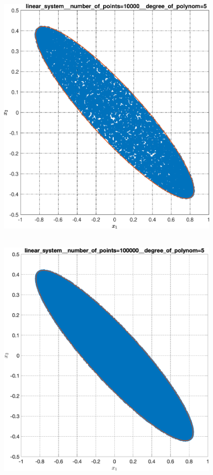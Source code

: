 \documentclass[../main.tex]{subfiles}
\begin{document}
\begin{figure}[ht!]
\begin{minipage}[b]{.49\linewidth}
  		\includegraphics[width=\linewidth]{images/linear_system__number_of_points=10000__degree_of_polynom=5.eps}
  	\end{minipage} 
  	\vfill
  	\hspace{-2.5ex}
  	\begin{minipage}[b]{.49\linewidth} 
  		\small
  		\centering 
  		\includegraphics[width=\linewidth]{images/linear_system__number_of_points=100000__degree_of_polynom=5.eps}

\end{minipage}
\end{figure}
\end{document}
